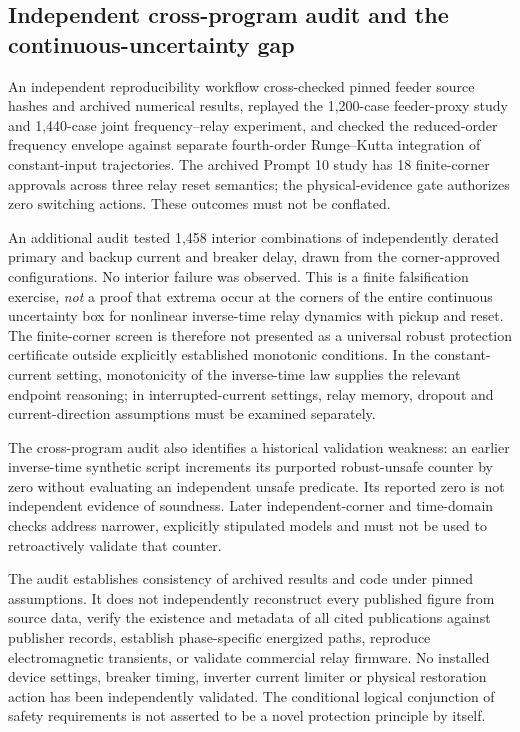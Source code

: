 \subsection{Independent cross-program audit and the continuous-uncertainty gap}
\label{sec:p11-audit}
An independent reproducibility workflow cross-checked pinned feeder source hashes and archived numerical results, replayed the 1,200-case feeder-proxy study and 1,440-case joint frequency--relay experiment, and checked the reduced-order frequency envelope against separate fourth-order Runge--Kutta integration of constant-input trajectories. The archived Prompt 10 study has 18 finite-corner approvals across three relay reset semantics; the physical-evidence gate authorizes zero switching actions. These outcomes must not be conflated.

An additional audit tested 1,458 interior combinations of independently derated primary and backup current and breaker delay, drawn from the corner-approved configurations. No interior failure was observed. This is a finite falsification exercise, \emph{not} a proof that extrema occur at the corners of the entire continuous uncertainty box for nonlinear inverse-time relay dynamics with pickup and reset. The finite-corner screen is therefore not presented as a universal robust protection certificate outside explicitly established monotonic conditions. In the constant-current setting, monotonicity of the inverse-time law supplies the relevant endpoint reasoning; in interrupted-current settings, relay memory, dropout and current-direction assumptions must be examined separately.

The cross-program audit also identifies a historical validation weakness: an earlier inverse-time synthetic script increments its purported robust-unsafe counter by zero without evaluating an independent unsafe predicate. Its reported zero is not independent evidence of soundness. Later independent-corner and time-domain checks address narrower, explicitly stipulated models and must not be used to retroactively validate that counter.

The audit establishes consistency of archived results and code under pinned assumptions. It does not independently reconstruct every published figure from source data, verify the existence and metadata of all cited publications against publisher records, establish phase-specific energized paths, reproduce electromagnetic transients, or validate commercial relay firmware. No installed device settings, breaker timing, inverter current limiter or physical restoration action has been independently validated. The conditional logical conjunction of safety requirements is not asserted to be a novel protection principle by itself.
